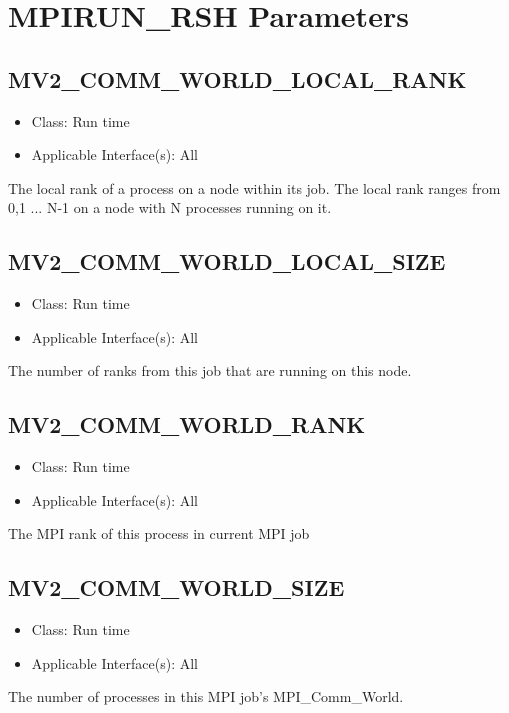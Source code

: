 \section{MPIRUN\_RSH Parameters}
\label{def:mpirun_rsh-parameters}

\subsection{MV2\_COMM\_WORLD\_LOCAL\_RANK}
\label{def:mv2_comm_world_local_rank}
\begin{itemize}
    \item Class: Run time
	\item Applicable Interface(s): All
\end{itemize}
The local rank of a process on a node within its job. 
The local rank ranges from 0,1 ... N-1 on a node with N processes running on it.

\subsection{MV2\_COMM\_WORLD\_LOCAL\_SIZE}
\label{def:mv2_comm_world_local_size}
\begin{itemize}
    \item Class: Run time
	\item Applicable Interface(s): All
\end{itemize}
The number of ranks from this job that are running on this node.

\subsection{MV2\_COMM\_WORLD\_RANK}
\label{def:mv2_comm_world_rank}
\begin{itemize}
    \item Class: Run time
	\item Applicable Interface(s): All
\end{itemize}
The MPI rank of this process in current MPI job

\subsection{MV2\_COMM\_WORLD\_SIZE}
\label{def:mv2_comm_world_size}
\begin{itemize}
    \item Class: Run time
	\item Applicable Interface(s): All
\end{itemize}
The number of processes in this MPI job's MPI\_Comm\_World.

